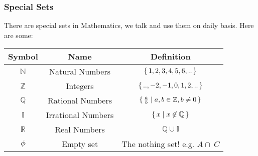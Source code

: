 \subsubsection{Special Sets}
There are special sets in Mathematics, we talk and use them on daily basis. Here are some:
\begin{center}
\begin{tabular}{| c | c | c | }
\hline
Symbol & Name & Definition \\
\hline
$\mathbb{N}$      & Natural Numbers & $\set{1,2,3,4,5,6,..}$ \\
$\mathbb{Z}$      & Integers  & $\set{..,-2,-1,0,1,2,..}$        \\
$\mathbb{Q}$      & Rational Numbers & $\set{ \frac{a}{b} \mid a,b \in \mathbb{Z}, b \neq 0}$  \\
$\mathbb{I}$      & Irrational Numbers & $\set{ x \mid x \not\in \mathbb{Q}}$ \\
$\mathbb{R}$      & Real Numbers  &  $\mathbb{Q} \cup \mathbb{I}$  \\
$\mathbb{\phi}$   & Empty set   &   The nothing set! e.g. $A \cap \  C$ \\
\hline
\end{tabular}
\end{center}
